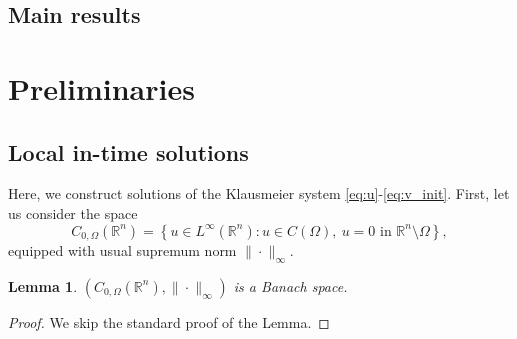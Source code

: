 \documentclass[12pt, a4paper]{article}
\theoremstyle{break}
\theoremstyle{break}
\theoremstyle{break}
\theoremstyle{break}
\theoremstyle{break}
\newtheorem{lem}{Lemma}[section]
\theoremstyle{break}
\theoremstyle{break}
\begin{document}
\subsection{Main results}

\section{Preliminaries}
\subsection{Local in-time solutions} 
Here, we construct solutions of the Klausmeier system \eqref{eq:u}-\eqref{eq:v_init}. First, let us consider the space
\begin{equation}
    \label{EQ:C_0_OMEGA}
    C_{0, \Omega}(\mathbb{R}^n) = \left\{ u \in L^\infty(\mathbb{R}^n): u \in C(\Omega), \: u = 0 \text{ in } \mathbb{R}^n \setminus \Omega \right\},
\end{equation}
equipped with usual supremum norm $\|\cdot\|_\infty$.
\begin{lem}
    \label{lem:C_0_OMEGA_BANACH_SPACE}
    $\left(C_{0, \Omega}(\mathbb{R}^n), \|\cdot\|_\infty\right)$ is a Banach space.
\end{lem}
\begin{proof}
We skip the standard proof of the Lemma.
\end{proof}
\end{document}
